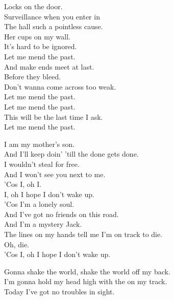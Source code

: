 Locks on the door. \\
Surveillance when you enter in \\
The hall such a pointless cause. \\
Her cups on my wall. \\
It's hard to be ignored. \\

Let me mend the past. \\
And make ends meet at last. \\
Before they bleed. \\
Don't wanna come across too weak. \\

Let me mend the past. \\
Let me mend the past. \\
This will be the last time I ask. \\
Let me mend the past. \\




I am my mother's son. \\
And I'll keep doin' 'till the done gets done. \\
I wouldn't steal for free. \\
And I won't see you next to me. \\

'Cos I, oh I. \\
I, oh I hope I don't wake up. \\

'Cos I'm a lonely soul. \\
And I've got no friends on this road. \\
And I'm a mystery Jack. \\
The lines on my hands tell me I'm on track to die. \\

Oh, die. \\
'Cos I, oh I hope I don't wake up. \\




Gonna shake the world, shake the world off my back. \\
I'm gonna hold my head high with the  on my track. \\
Today I've got no troubles in sight. \\

